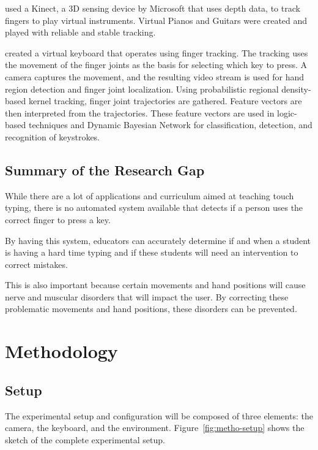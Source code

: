 \documentclass{report}
\begin{document}
\cite{chiang2014} used a Kinect, a 3D sensing device by Microsoft that
uses depth data, to track fingers to play virtual instruments. Virtual Pianos
and Guitars were created and played with reliable and stable tracking.

\cite{yousaf2014} created a virtual keyboard that operates using finger
tracking. The tracking uses the movement of the finger joints as the basis for
selecting which key to press. A camera captures the movement, and the resulting
video stream is used for hand region detection and finger joint localization.
Using probabilistic regional density-based kernel tracking, finger joint
trajectories are gathered. Feature vectors are then interpreted from the
trajectories. These feature vectors are used in logic-based techniques and
Dynamic Bayesian Network for classification, detection, and recognition of
keystrokes.

\section{Summary of the Research Gap}
While there are a lot of applications and curriculum aimed at teaching touch
typing, there is no automated system available that detects if a person uses the
correct finger to press a key.

By having this system, educators can accurately determine if and when a student
is having a hard time typing and if these students will need an intervention to
correct mistakes.

This is also important because certain movements and hand positions will cause
nerve and muscular disorders that will impact the user. By correcting these
problematic movements and hand positions, these disorders can be prevented.

\chapter{Methodology}

\section{Setup}
\label{section:metho-setup}

The experimental setup and configuration will be composed of three elements: the
camera, the keyboard, and the environment. Figure~\ref{fig:metho-setup}
shows the sketch of the complete experimental setup.
\end{document}
